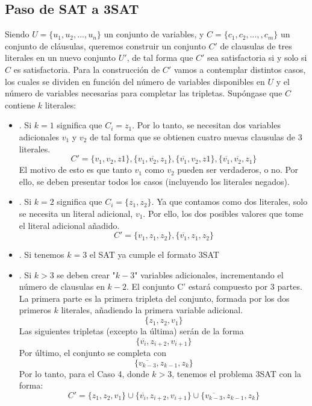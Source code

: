 \documentclass{article}
\begin{document}
\subsection{Paso de SAT a 3SAT}
Siendo $ U = \{u_1, u_2,...,u_n\}$ un conjunto de variables, y $ C = \{c_1, c_2, ...,, c_m\}$ un conjunto de cláusulas, queremos construir un conjunto $C'$ de clausulas de tres literales en un nuevo conjunto $U'$, de tal forma que $C'$ sea satisfactoria si y solo si $C$ es satisfactoria.
Para la construcción de $C'$ vamos a contemplar distintos casos, los cuales se dividen en función del número de variables disponibles en $U$ y el número de variables necesarias para completar las tripletas.
Supóngase que $C$ contiene $k$ literales:
\begin{itemize}
    \item {}. Si $k=1$ significa que $C_i = z_1$. Por lo tanto, se necesitan dos variables adicionales $v_1$ y $v_2$ de tal forma que se obtienen cuatro nuevas clausulas de 3 literales. 
    $$ C' = \{v_1, v_2, z1\}, \{v_1, \overline {v_2}, z_1\}, \{\overline{v_1}, v_2, z1\}, \{\overline{v_1}, \overline{v_2}, z_1\} $$
    El motivo de esto es que tanto $v_1$ como $v_2$ pueden ser verdaderos, o no. Por ello, se deben presentar todos los casos (incluyendo los literales negados).
    \item {}. Si $k=2$ significa que $C_i = \{z_1, z_2\}$. Ya que contamos como dos literales, solo se necesita un literal adicional, $v_1$. Por ello, los dos posibles valores que tome el literal adicional añadido.
        $$ C' = \{v_1, z_1, z_2\}, \{\overline{v_1}, z_1, z_2\}$$
    \item {}. Si tenemos $k=3$ el SAT ya cumple el formato 3SAT
    \item {}. Si $k>3$ se deben crear "$k-3$" variables adicionales, incrementando el número de clausulas en $k-2$. El conjunto C' estará compuesto por 3 partes. La primera parte es la primera tripleta del conjunto, formada por los dos primeros $k$ literales, añadiendo la primera variable adicional.
        $$ \{z_1, z_2, v_1\}$$
    Las siguientes tripletas (excepto la última) serán de la forma
    $$ \{\overline{v_i}, z_{i+2}, v_{i+1}\}$$
    Por último, el conjunto se completa con
        $$ \{\overline{v_{k-3}}, z_{k-1}, z_k\}$$
    Por lo tanto, para el Caso 4, donde $k>3$, tenemos el problema 3SAT con la forma:
        $$ C' = \{z_1, z_2, v_1\} \cup \{\overline{v_i}, z_{i+2}, v_{i+1}\} \cup \{\overline{v_{k-3}}, z_{k-1}, z_k\}$$

\end{itemize}
\end{document}
